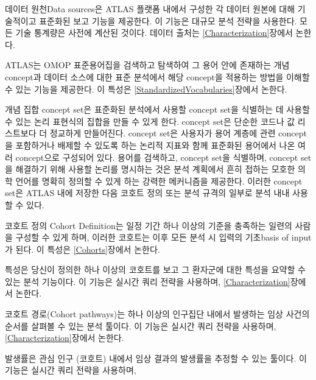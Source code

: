 \documentclass[10.5pt]{book}
\providecommand{\tightlist}{%
  \setlength{\itemsep}{0pt}\setlength{\parskip}{0pt}}
\theoremstyle{definition}
\theoremstyle{definition}
\theoremstyle{definition}
\theoremstyle{remark}
\begin{document}
\begin{description}
\tightlist
\item[Data Sources \index{ATLAS!Data Sources}
\index{Achilles|see {ATLAS!data sources}}]
데이터 원천Data sources은 ATLAS 플랫폼 내에서 구성한 각 데이터 원본에
대해 기술적이고 표준화된 보고 기능을 제공한다. 이 기능은 대규모 분석
전략을 사용한다. 모든 기술 통계량은 사전에 계산된 것이다. 데이터 출처는
\ref{Characterization}장에서 논한다.
\item[Vocabulary Search \index{ATLAS!vocabulary search}]
ATLAS는 OMOP 표준용어집을 검색하고 탐색하여 그 용어 안에 존재하는 개념
concept과 데이터 소스에 대한 표준 분석에서 해당 concept을 적용하는
방법을 이해할 수 있는 기능을 제공한다. 이 특성은
\ref{StandardizedVocabularies}장에서 논한다.
\item[Concept Sets \index{ATLAS!concept sets}]
개념 집합 concept set은 표준화된 분석에서 사용할 concept set을 식별하는
데 사용할 수 있는 논리 표현식의 집합을 만들 수 있게 한다. concept set은
단순한 코드나 값 리스트보다 더 정교하게 만들어진다. concept set은
사용자가 용어 계층에 관련 concept을 포함하거나 배제할 수 있도록 하는
논리적 지표와 함께 표준화된 용어에서 나온 여러 concept으로 구성되어
있다. 용어를 검색하고, concept set을 식별하며, concept set을 해결하기
위해 사용할 논리를 명시하는 것은 분석 계획에서 흔히 접하는 모호한 의학
언어를 명확히 정의할 수 있게 하는 강력한 메커니즘을 제공한다. 이러한
concept set은 ATLAS 내에 저장한 다음 코호트 정의 또는 분석 규격의 일부로
분석 내내 사용할 수 있다.
\item[Cohort Definitions \index{ATLAS!cohort definitions}]
코호트 정의 Cohort Definition는 일정 기간 하나 이상의 기준을 충족하는
일련의 사람을 구성할 수 있게 하며, 이러한 코호트는 이후 모든 분석 시
입력의 기초basis of input가 된다. 이 특성은 \ref{Cohorts}장에서 논한다.
\item[Characterizations \index{ATLAS!cohort characterization}]
특성은 당신이 정의한 하나 이상의 코호트를 보고 그 환자군에 대한 특성을
요약할 수 있는 분석 기능이다. 이 기능은 실시간 쿼리 전략을 사용하며,
\ref{Characterization}장에서 논한다.
\item[Cohort Pathways \index{ATLAS!cohort pathways}]
코호트 경로(Cohort pathways)는 하나 이상의 인구집단 내에서 발생하는 임상
사건의 순서를 살펴볼 수 있는 분석 툴이다. 이 기능은 실시간 쿼리 전략을
사용하며, \ref{Characterization}장에서 논한다.
\item[Incidence Rates \index{ATLAS!incidence rates}]
발생률은 관심 인구 (코호트) 내에서 임상 결과의 발생률을 추정할 수 있는
툴이다. 이 기능은 실시간 쿼리 전략을 사용하며,

\end{description}
\end{document}

